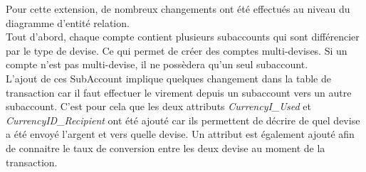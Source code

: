 Pour cette extension, de nombreux changements ont été effectués au niveau du diagramme d'entité relation.\\
Tout d'abord, chaque compte contient plusieurs subaccounts qui sont différencier par le type de devise. Ce qui permet de créer des comptes multi-devises. 
Si un compte n'est pas multi-devise, il ne possèdera qu'un seul subaccount.\\
L'ajout de ces SubAccount implique quelques changement dans la table de transaction car il faut effectuer le virement depuis un subaccount vers un autre subaccount.
C'est pour cela que les deux attributs \textit{CurrencyI\_Used} et \textit{CurrencyID\_Recipient} ont été ajouté car ils permettent de décrire de quel devise a été envoyé l'argent et vers quelle devise.
Un attribut est également ajouté afin de connaitre le taux de conversion entre les deux devise au moment de la transaction.
